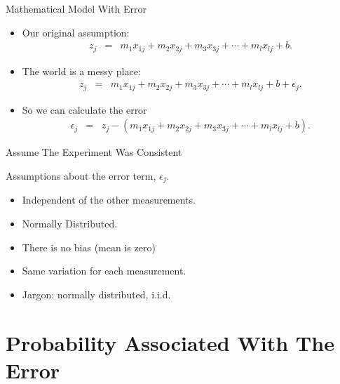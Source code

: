 \documentclass[svgnames,table,,aspectratio=169]{beamer}
\begin{document}
\begin{frame}{Mathematical Model With Error}

  \begin{itemize}
  \item Our original assumption:
    \begin{eqnarray*}
      z_j & = & m_1 x_{1j} + m_2 x_{2j} + m_3 x_{3j} + \cdots + m_l x_{lj} + b.
    \end{eqnarray*}

  \item The world is a messy place:
    \begin{eqnarray*}
      z_j & = & m_1 x_{1j} + m_2 x_{2j} + m_3 x_{3j} + \cdots + m_l x_{lj} + b + \epsilon_j.
    \end{eqnarray*}

  \item So we can calculate the error
    \begin{eqnarray*}
      \epsilon_j  & = & z_j - \left(m_1 x_{1j} + m_2 x_{2j} + m_3 x_{3j} + \cdots + m_l x_{lj} + b \right).
    \end{eqnarray*}

  \end{itemize}
  
\end{frame}

\begin{frame}{Assume The Experiment Was Consistent}

  Assumptions about the error term, $\epsilon_j$.
  \begin{itemize}
  \item Independent of the other measurements.
  \item Normally Distributed.
  \item There is no bias (mean is zero)
  \item Same variation for each measurement.
  \item Jargon: normally distributed, i.i.d. 
  \end{itemize}

\end{frame}

\section{Probability Associated With The Error}
\end{document}
